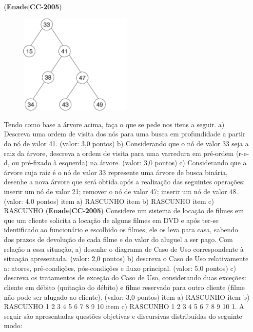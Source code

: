 \documentclass{exam}
\begin{document}
\begin{questions}
\question (\textbf{Enade}$|$\textbf{CC}-\textbf{2005}) \begin{figure}[H]
	\begin{center}
		\includegraphics[width=0.5\textwidth]{CIENCIA_DA_COMPUTACAO_Prova2005-utf8_figuras/fig-0015.jpg}
	\end{center}
\end{figure}
Tendo como base a árvore acima, faça o que se pede nos itens a seguir.
a) Descreva uma ordem de visita dos nós para uma busca em profundidade a partir do nó de valor 41. (valor: 3,0 pontos)
b) Considerando que o nó de valor 33 seja a raiz da árvore, descreva a ordem de visita para uma varredura em pré-ordem
(r-e-d, ou pré-fixado à esquerda) na árvore. (valor: 3,0 pontos)
c) Considerando que a árvore cuja raiz é o nó de valor 33 represente uma árvore de busca binária, desenhe a nova árvore que será
obtida após a realização das seguintes operações: inserir um nó de valor 21; remover o nó de valor 47; inserir um nó de valor 48.
(valor: 4,0 pontos)
item a) RASCUNHO
item b) RASCUNHO
item c) RASCUNHO
\question (\textbf{Enade}$|$\textbf{CC}-\textbf{2005}) Considere um sistema de locação de filmes em que um cliente solicita a locação de alguns filmes em DVD e após ter-se
identificado ao funcionário e escolhido os filmes, ele os leva para casa, sabendo dos prazos de devolução de cada filme e do
valor do aluguel a ser pago.
Com relação a essa situação,
a) desenhe o diagrama de Caso de Uso correspondente à situação apresentada. (valor: 2,0 pontos)
b) descreva o Caso de Uso relativamente a: atores, pré-condições, pós-condições e fluxo principal. (valor: 5,0 pontos)
c) descreva os tratamentos de exceção do Caso de Uso, considerando duas exceções: cliente em débito (quitação do débito) e filme
reservado para outro cliente (filme não pode ser alugado ao cliente). (valor: 3,0 pontos)
item a) RASCUNHO
item b) RASCUNHO
1
2
3
4
5
6
7
8
9
10
item c) RASCUNHO
1
2
3
4
5
6
7
8
9
10
1. A seguir são apresentadas questões objetivas e discursivas distribuídas do seguinte modo:

\end{questions}
\end{document}
